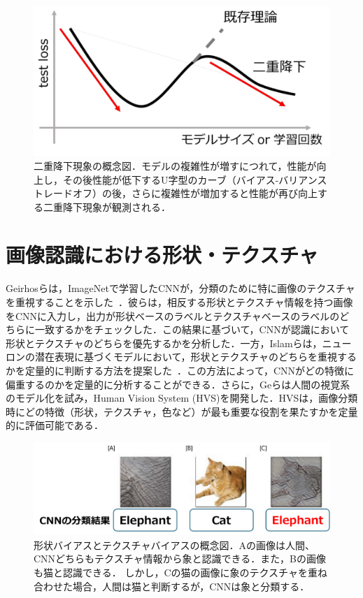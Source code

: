 \begin{figure}[h]
    \centering
    \includegraphics[width=\linewidth]{fig/doubledescent.pdf}
    \caption[二重降下現象の概念図．]{二重降下現象の概念図．モデルの複雑性が増すにつれて，性能が向上し，その後性能が低下するU字型のカーブ（バイアス-バリアンス トレードオフ）の後，さらに複雑性が増加すると性能が再び向上する二重降下現象が観測される．}
    \label{fig:DoubleDescent}
\end{figure}

\section{画像認識における形状・テクスチャ}
Geirhosらは，ImageNetで学習したCNNが，分類のために特に画像のテクスチャを重視することを示した~\cite{Geirhos}．彼らは，相反する形状とテクスチャ情報を持つ画像をCNNに入力し，出力が形状ベースのラベルとテクスチャベースのラベルのどちらに一致するかをチェックした．この結果に基づいて，CNNが認識において形状とテクスチャのどちらを優先するかを分析した．一方，Islamらは，ニューロンの潜在表現に基づくモデルにおいて，形状とテクスチャのどちらを重視するかを定量的に判断する方法を提案した~\cite{Islam}．この方法によって，CNNがどの特徴に偏重するのかを定量的に分析することができる．さらに，Geらは人間の視覚系のモデル化を試み，Human Vision System (HVS)を開発した．HVSは，画像分類時にどの特徴（形状，テクスチャ，色など）が最も重要な役割を果たすかを定量的に評価可能である\cite{Ge}．

\begin{figure}[h]
    \centering
    \includegraphics[width=\linewidth]{fig/shapetexturebias.pdf}
    \caption{形状バイアスとテクスチャバイアスの概念図．Aの画像は人間、CNNどちらもテクスチャ情報から象と認識できる．また，Bの画像も猫と認識できる．
    しかし，Cの猫の画像に象のテクスチャを重ね合わせた場合，人間は猫と判断するが，CNNは象と分類する．}
\end{figure}


